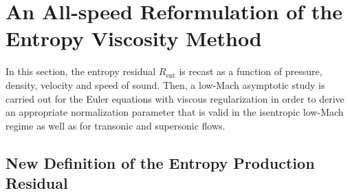 \documentclass[review,10pt]{elsarticle}
\newcommand{\resi}{R_\text{ent}}
\begin{document}
\section{An All-speed Reformulation of the Entropy Viscosity Method} \label{sec:extension}

In this section, the entropy residual $\resi$ is recast as a function of pressure, density, velocity and speed 
of sound. Then, a low-Mach asymptotic study is carried out for the Euler equations with viscous regularization 
in order to derive an appropriate normalization parameter that is valid in the isentropic low-Mach regime as well as for 
transonic and supersonic flows. 

\subsection{New Definition of the Entropy Production Residual}\label{sec:new_ent_prod} 
\end{document}
